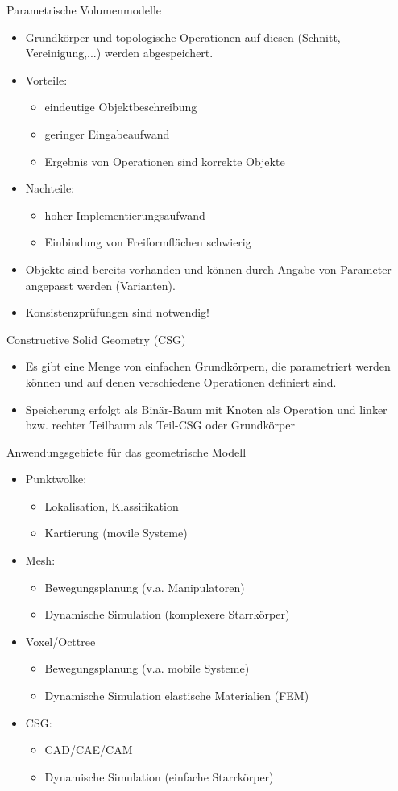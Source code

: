 \documentclass[paper=a4, fontsize=11pt]{scrartcl} %
\numberwithin{equation}{section} %
\numberwithin{figure}{section} %
\numberwithin{table}{section} %
\begin{document}
Parametrische Volumenmodelle
\begin{itemize}
\item Grundkörper und topologische Operationen auf diesen (Schnitt, Vereinigung,...) werden abgespeichert.
\item Vorteile:
\begin{itemize}
\item eindeutige Objektbeschreibung
\item geringer Eingabeaufwand
\item Ergebnis von Operationen sind korrekte Objekte
\end{itemize}
\item Nachteile:
\begin{itemize}
\item hoher Implementierungsaufwand
\item Einbindung von Freiformflächen schwierig
\end{itemize}
\item Objekte sind bereits vorhanden und können durch Angabe von Parameter angepasst werden (Varianten).
\item Konsistenzprüfungen sind notwendig!
\end{itemize}

Constructive Solid Geometry (CSG)
\begin{itemize}
\item Es gibt eine Menge von einfachen Grundkörpern, die parametriert werden können und auf denen verschiedene Operationen definiert sind.
\item Speicherung erfolgt als Binär-Baum mit Knoten als Operation und linker bzw. rechter Teilbaum als Teil-CSG oder Grundkörper
\end{itemize}

Anwendungsgebiete für das geometrische Modell
\begin{itemize}
\item Punktwolke:
\begin{itemize}
\item Lokalisation, Klassifikation
\item Kartierung (movile Systeme)
\end{itemize}
\item Mesh: 
\begin{itemize}
\item Bewegungsplanung (v.a. Manipulatoren)
\item Dynamische Simulation (komplexere Starrkörper)
\end{itemize}
\item Voxel/Octtree
\begin{itemize}
\item Bewegungsplanung (v.a. mobile Systeme)
\item Dynamische Simulation elastische Materialien (FEM)
\end{itemize}
\item CSG:
\begin{itemize}
\item CAD/CAE/CAM
\item Dynamische Simulation (einfache Starrkörper)
\end{itemize}
\end{itemize}
\end{document}
